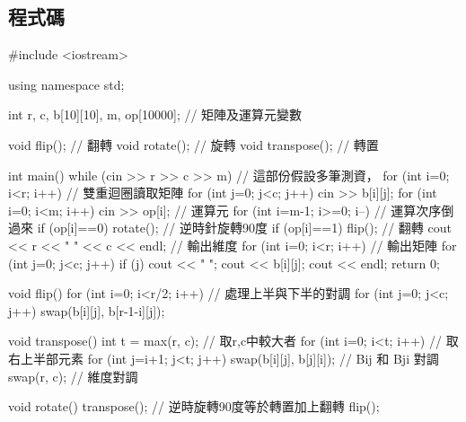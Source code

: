 \subsection{程式碼}
\begin{cppcode}
#include <iostream>

using namespace std;

int r, c, b[10][10], m, op[10000]; // 矩陣及運算元變數

void flip(); // 翻轉
void rotate(); // 旋轉
void transpose(); // 轉置

int main()
{
	while (cin >> r >> c >> m) { // 這部份假設多筆測資，
		for (int i=0; i<r; i++) { // 雙重迴圈讀取矩陣
			for (int j=0; j<c; j++) cin >> b[i][j];
		}
		for (int i=0; i<m; i++) cin >> op[i]; // 運算元
		for (int i=m-1; i>=0; i--) { // 運算次序倒過來
			if (op[i]==0) rotate(); // 逆時針旋轉90度
			if (op[i]==1) flip(); // 翻轉
		}
		cout << r << " " << c << endl; // 輸出維度
		for (int i=0; i<r; i++) { // 輸出矩陣
			for (int j=0; j<c; j++) {
				if (j) cout << " ";
				cout << b[i][j];
			}
			cout << endl;
		}
	}
	return 0;
}

void flip()
{
	for (int i=0; i<r/2; i++) { // 處理上半與下半的對調
		for (int j=0; j<c; j++) swap(b[i][j], b[r-1-i][j]);
	}
}

void transpose()
{
	int t = max(r, c); // 取r,c中較大者
	for (int i=0; i<t; i++) { // 取右上半部元素
		for (int j=i+1; j<t; j++) {
			swap(b[i][j], b[j][i]); // Bij 和 Bji 對調
		}
	}
	swap(r, c); // 維度對調
}

void rotate()
{
	transpose(); // 逆時旋轉90度等於轉置加上翻轉
	flip();
}	
\end{cppcode}	
